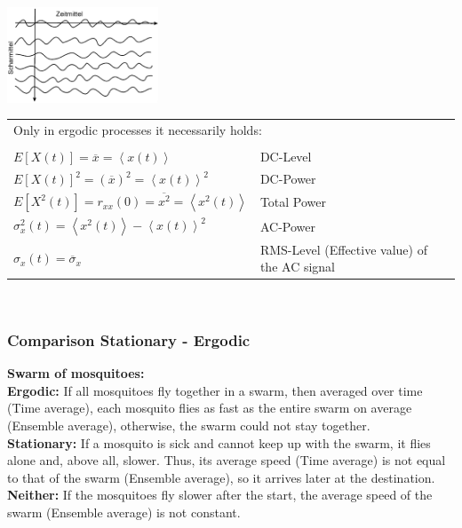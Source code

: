 			\begin{minipage}{5cm}
				\includegraphics[width=4.5cm]{bilder/zeit-scharmittel.png}
			\end{minipage}
			\begin{minipage}{13.5cm}

			\begin{tabular}{ll}
				\multicolumn{2}{l}{Only in ergodic processes it necessarily holds:} \\ \\
			  $E[X(t)] = \overline{x} = \left\langle x(t) \right\rangle$ & DC-Level \\
			  $E[X(t)]^{2} = (\overline{x})^{2} = \left\langle x(t) \right\rangle^{2}$ & DC-Power \\
			  $E[X^{2}(t)] = r_{xx}(0) = \overline{x^{2}} =
							 \left\langle x^{2}(t) \right\rangle $ & Total Power \\
			  $\sigma_{x}^{2}(t) = \left\langle x^{2}(t) \right\rangle
								   - \left\langle x(t) \right\rangle^{2}$ & AC-Power \\
			  $\sigma_{x}(t) = \overline{\sigma}_{x}$ & RMS-Level (Effective value) of the AC signal\\
			\end{tabular} \\
			\end{minipage}


		\subsubsection{Comparison Stationary - Ergodic}
		\textbf{Swarm of mosquitoes:}\\
		\textbf{Ergodic:} If all mosquitoes fly together in a swarm, then averaged over time (Time average), each mosquito flies as fast as the entire swarm on average (Ensemble average), otherwise, the swarm could not stay together. \\
		\textbf{Stationary:} If a mosquito is sick and cannot keep up with the swarm, it flies alone and, above all, slower. Thus, its average speed (Time average) is not equal to that of the swarm (Ensemble average), so it arrives later at the destination. \\
		\textbf{Neither:} If the mosquitoes fly slower after the start, the average speed of the swarm (Ensemble average) is not constant.

